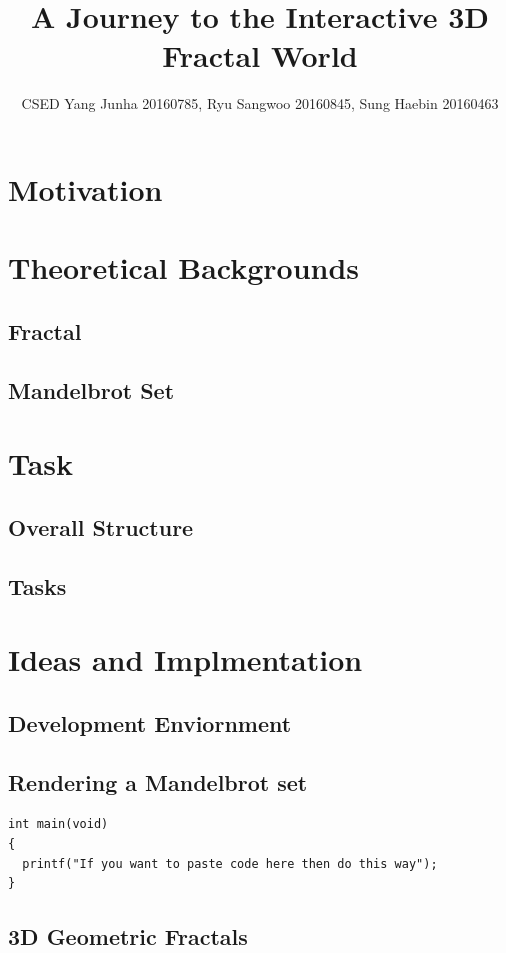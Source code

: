 \documentclass[a4paper]{article}
\title{A Journey to the Interactive 3D Fractal World}
\author{CSED Yang Junha 20160785, Ryu Sangwoo 20160845, Sung Haebin 20160463}
\begin{document}
\maketitle
\begin{abstract}

\end{abstract}
\section{Motivation}

\section{Theoretical Backgrounds}
\subsection{Fractal}
\subsection{Mandelbrot Set}

\section{Task}
\subsection{Overall Structure}
\subsection{Tasks}


\section{Ideas and Implmentation}
\subsection{Development Enviornment}
\subsection{Rendering a Mandelbrot set}

\begin{lstlisting}[style=CStyle]
int main(void)
{
  printf("If you want to paste code here then do this way");
}
\end{lstlisting}
\subsection{3D Geometric Fractals}
\end{document}

